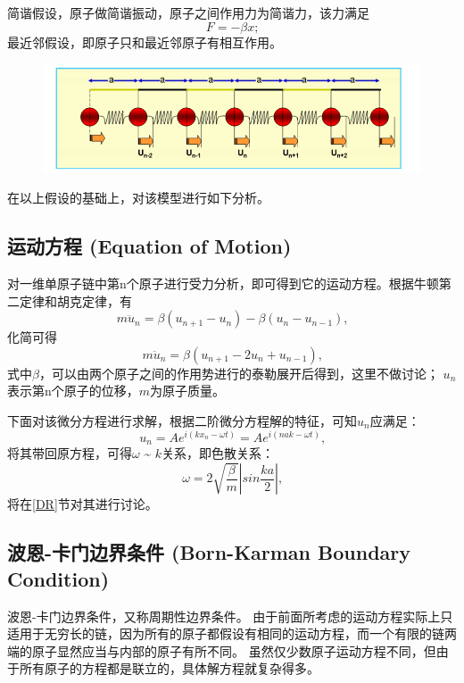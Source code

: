 \documentclass[declarePage]{ecnuthesis}
\begin{document}
简谐假设，原子做简谐振动，原子之间作用力为简谐力，该力满足
\begin{equation}
    F = - \beta x \text{;}
\end{equation}
最近邻假设，即原子只和最近邻原子有相互作用。
\begin{figure}[htb]
    \centering
    \includegraphics[width=.7\textwidth]{1DMC.png}
    \label{1DMC}
\end{figure}

在以上假设的基础上，对该模型进行如下分析。

\subsection{运动方程 (Equation of Motion)}

对一维单原子链中第n个原子进行受力分析，即可得到它的运动方程。根据牛顿第二定律和胡克定律，有
\begin{equation}
    m \ddot{u}_n = \beta (u_{n+1} - u_n) - \beta (u_n - u_{n-1}) \text{,}
\end{equation}
化简可得
\begin{equation}
    m \ddot{u}_n = \beta (u_{n+1} - 2u_n + u_{n-1}) \text{,}
\end{equation}
式中$\beta$，可以由两个原子之间的作用势进行的泰勒展开后得到，这里不做讨论；%
$u_n$表示第n个原子的位移，$m$为原子质量。

下面对该微分方程进行求解，根据二阶微分方程解的特征，可知$u_n$应满足：
\begin{equation}
    u_n = A e^{i(kx_n - \omega t)} = A e^{i(nak - \omega t)} \text{,} \label{EOM}
\end{equation}
将其带回原方程，可得$\omega$ \~{} $k$关系，即色散关系：
\begin{equation}
    \omega = 2 \sqrt{\frac{\beta}{m}} \left | sin \frac{ka}{2} \right | \text{,} \label{DRE}
\end{equation}
将在\ref{DR}节对其进行讨论。

\subsection{波恩-卡门边界条件 (Born-Karman Boundary Condition)}
波恩-卡门边界条件，又称周期性边界条件。%
由于前面所考虑的运动方程实际上只适用于无穷长的链，因为所有的原子都假设有相同的运动方程，而一个有限的链两端的原子显然应当与内部的原子有所不同。%
虽然仅少数原子运动方程不同，但由于所有原子的方程都是联立的，具体解方程就复杂得多。
\end{document}
